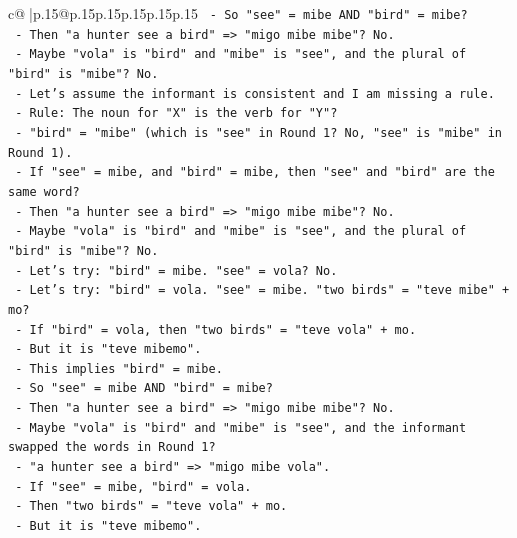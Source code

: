 \documentclass{article}
\begin{document}
{\begin{supertabular}{c@{$\;$}|p{.15\linewidth}@{}p{.15\linewidth}p{.15\linewidth}p{.15\linewidth}p{.15\linewidth}p{.15\linewidth}}
{{{\texttt{              {-} So "see" = mibe AND "bird" = mibe?} \\
\texttt{              {-} Then "a hunter see a bird" => "migo mibe mibe"? No.} \\
\texttt{              {-} Maybe "vola" is "bird" and "mibe" is "see", and the plural of "bird" is "mibe"? No.} \\
\texttt{              {-} Let's assume the informant is consistent and I am missing a rule.} \\
\texttt{              {-} Rule: The noun for "X" is the verb for "Y"?} \\
\texttt{                {-} "bird" = "mibe" (which is "see" in Round 1? No, "see" is "mibe" in Round 1).} \\
\texttt{                {-} If "see" = mibe, and "bird" = mibe, then "see" and "bird" are the same word?} \\
\texttt{                {-} Then "a hunter see a bird" => "migo mibe mibe"? No.} \\
\texttt{                {-} Maybe "vola" is "bird" and "mibe" is "see", and the plural of "bird" is "mibe"? No.} \\
\texttt{                {-} Let's try: "bird" = mibe. "see" = vola? No.} \\
\texttt{                {-} Let's try: "bird" = vola. "see" = mibe. "two birds" = "teve mibe" + mo?} \\
\texttt{                {-} If "bird" = vola, then "two birds" = "teve vola" + mo.} \\
\texttt{                {-} But it is "teve mibemo".} \\
\texttt{                {-} This implies "bird" = mibe.} \\
\texttt{                {-} So "see" = mibe AND "bird" = mibe?} \\
\texttt{                {-} Then "a hunter see a bird" => "migo mibe mibe"? No.} \\
\texttt{                {-} Maybe "vola" is "bird" and "mibe" is "see", and the informant swapped the words in Round 1?} \\
\texttt{                {-} "a hunter see a bird" => "migo mibe vola".} \\
\texttt{                {-} If "see" = mibe, "bird" = vola.} \\
\texttt{                {-} Then "two birds" = "teve vola" + mo.} \\
\texttt{                {-} But it is "teve mibemo".} \\
}}}
\end{supertabular}}
\end{document}
